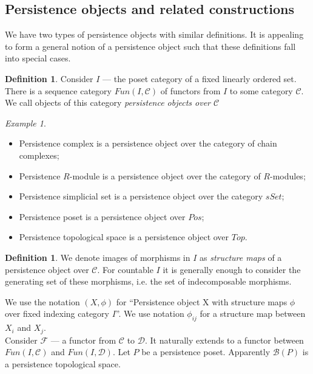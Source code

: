 \documentclass[english,12pt]{article}
\newcounter{stmcounter}[section]
\numberwithin{equation}{section}
\theoremstyle{definition}
\newtheorem{definition}[stmcounter]{Definition}
\theoremstyle{remark}
\newtheorem{example}[stmcounter]{Example}
\newcommand{\define}[1]{{\textit{#1}}}
\begin{document}
\subsection{Persistence objects and related constructions}

We have two types of persistence objects with similar definitions. It is appealing to form a general notion of a persistence object such that these definitions fall into special cases.\\

\begin{definition}
  Consider $I$ --- the poset category of a fixed linearly ordered set. There is a sequence category $Fun(I, \mathcal{C})$ of functors from $I$ to some category $\mathcal{C}$. We call objects of this category \define{persistence objects over $\mathcal{C}$}
\end{definition}

\begin{example} ~ \par
  \begin{itemize}
    \item Persistence complex is a persistence object over the category of chain complexes;
    \item Persistence $R$-module is a persistence object over the category of $R$-modules;
    \item Persistence simplicial set is a persistence object over the category $sSet$;
    \item Persistence poset is a persistence object over $Pos$;
    \item Persistence topological space is a persistence object over $Top$.
  \end{itemize}
\end{example}

\begin{definition}
  We denote images of morphisms in $I$ as \define{structure maps} of a persistence object over $\mathcal{C}$. For countable $I$ it is generally enough to consider the generating set of these morphisms, i.e. the set of indecomposable morphisms.
\end{definition}

We use the notation $(X,\phi)$ for ``Persistence object X with structure maps $\phi$ over fixed indexing category $I$''. We use notation $\phi_{ij}$ for a structure map between $X_i$ and $X_{j}$.\\

Consider $\mathcal{F}$ --- a functor from $\mathcal{C}$ to $\mathcal{D}$. It naturally extends to a functor between $Fun(I,\mathcal{C})$ and $Fun(I,\mathcal{D})$. Let $P$ be a persistence poset. Apparently $\mathcal{B}(P)$ is a persistence topological space.\\
\end{document}
